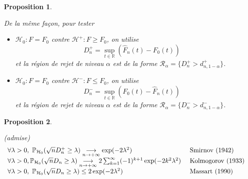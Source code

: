 \documentclass[
]{book}
\providecommand{\tightlist}{%
  \setlength{\itemsep}{0pt}\setlength{\parskip}{0pt}}
\newtheorem{proposition}{Proposition}[chapter]
\theoremstyle{definition}
\theoremstyle{definition}
\theoremstyle{definition}
\theoremstyle{definition}
\theoremstyle{remark}
\begin{document}
\begin{proposition}
\protect\hypertarget{prp:unlabeled-div-21}{}\label{prp:unlabeled-div-21}

De la même façon, pour tester

\begin{itemize}
\tightlist
\item
  \(\mathcal{H}_0 : F=F_0\) contre \(\mathcal{H}^{+} : F \geq F_0\), on utilise
  \[D_n^{+}= \sup_{t \in \mathbb{R}} (\hat{F}_n(t)-F_0(t))\]
  et la région de rejet de niveau \(\alpha\) est de la forme \(\mathcal R_\alpha = \{D_n^{+} > d_{n,1-\alpha}^{+}\}\).
\item
  \(\mathcal{H}_0 : F=F_0\) contre \(\mathcal{H}^{-} : F \leq F_0\), on utilise
  \[D_n^{-}= \sup_{t \in \mathbb{R}} (F_0(t) - \hat{F}_n(t))\]
  et la région de rejet de niveau \(\alpha\) est de la forme \(\mathcal R_\alpha = \{D_n^{-} > d_{n,1-\alpha}^{-}\}\).
\end{itemize}

\end{proposition}

\begin{proposition}
\protect\hypertarget{prp:unlabeled-div-22}{}\label{prp:unlabeled-div-22}

(admise)
\[
\begin{array}{l l }
\forall \lambda >0, \ \mathbb{P}_{\mathcal{H}_0}(\sqrt{n} D_n^+ \geq \lambda) \underset{n \rightarrow +\infty}{\longrightarrow}  \exp(-2\lambda^2)  & \mbox{ Smirnov (1942)} \\
\forall \lambda >0, \mathbb{P}_{\mathcal{H}_0}(\sqrt{n} D_n \geq \lambda)  \underset{n \rightarrow +\infty}{\longrightarrow} 2 \sum_{k=1}^{\infty}(-1)^{k+1}\exp(-2k^2 \lambda^2)  & \mbox{ Kolmogorov (1933)} \\
\forall \lambda >0, \ \mathbb{P}_{\mathcal{H}_0}(\sqrt{n} D_n \geq \lambda)\leq 2 \exp(-2\lambda^2)    & \mbox{ Massart (1990) }
\end{array}
\]

\end{proposition}
\end{document}

